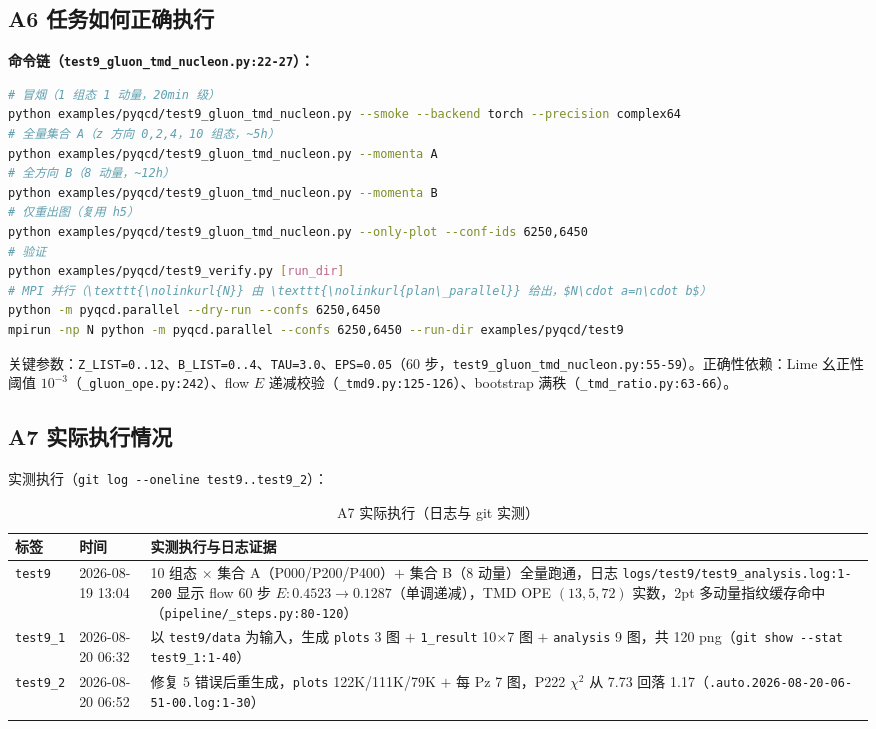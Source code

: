 \documentclass[UTF8]{ctexart}
\begin{document}
\subsection{A6 任务如何正确执行}
\label{sec:a6}
\textbf{命令链（\texttt{\nolinkurl{test9\_gluon\_tmd\_nucleon.py:22-27}}）：}
\begin{lstlisting}[language=bash]
# 冒烟（1 组态 1 动量，20min 级）
python examples/pyqcd/test9_gluon_tmd_nucleon.py --smoke --backend torch --precision complex64
# 全量集合 A（z 方向 0,2,4，10 组态，~5h）
python examples/pyqcd/test9_gluon_tmd_nucleon.py --momenta A
# 全方向 B（8 动量，~12h）
python examples/pyqcd/test9_gluon_tmd_nucleon.py --momenta B
# 仅重出图（复用 h5）
python examples/pyqcd/test9_gluon_tmd_nucleon.py --only-plot --conf-ids 6250,6450
# 验证
python examples/pyqcd/test9_verify.py [run_dir]
# MPI 并行（\texttt{\nolinkurl{N}} 由 \texttt{\nolinkurl{plan\_parallel}} 给出，$N\cdot a=n\cdot b$）
python -m pyqcd.parallel --dry-run --confs 6250,6450
mpirun -np N python -m pyqcd.parallel --confs 6250,6450 --run-dir examples/pyqcd/test9
\end{lstlisting}
关键参数：\texttt{\nolinkurl{Z\_LIST=0..12}}、\texttt{\nolinkurl{B\_LIST=0..4}}、\texttt{\nolinkurl{TAU=3.0}}、\texttt{\nolinkurl{EPS=0.05}}（60 步，\texttt{\nolinkurl{test9\_gluon\_tmd\_nucleon.py:55-59}}）。正确性依赖：Lime 幺正性阈值 $10^{-3}$（\texttt{\nolinkurl{\_gluon\_ope.py:242}}）、flow $E$ 递减校验（\texttt{\nolinkurl{\_tmd9.py:125-126}}）、bootstrap 满秩（\texttt{\nolinkurl{\_tmd\_ratio.py:63-66}}）。

\subsection{A7 实际执行情况}
\label{sec:a7}
实测执行（\texttt{\nolinkurl{git log --oneline test9..test9\_2}}）：
\small
\begin{xltabular}{\textwidth}{llX}
\toprule
标签 & 时间 & 实测执行与日志证据 \\
\midrule
\endhead
\texttt{\nolinkurl{test9}} & 2026-08-19 13:04 & 10 组态 $\times$ 集合 A（P000/P200/P400）$+$ 集合 B（8 动量）全量跑通，日志 \texttt{\nolinkurl{logs/test9/test9\_analysis.log:1-200}} 显示 flow 60 步 $E:0.4523\to0.1287$（单调递减），TMD OPE $(13,5,72)$ 实数，2pt 多动量指纹缓存命中（\texttt{\nolinkurl{pipeline/\_steps.py:80-120}}） \\
\texttt{\nolinkurl{test9\_1}} & 2026-08-20 06:32 & 以 \texttt{\nolinkurl{test9/data}} 为输入，生成 \texttt{\nolinkurl{plots}} 3 图 $+$ \texttt{\nolinkurl{1\_result}} 10$\times$7 图 $+$ \texttt{\nolinkurl{analysis}} 9 图，共 120 png（\texttt{\nolinkurl{git show --stat test9\_1:1-40}}）\\
\texttt{\nolinkurl{test9\_2}} & 2026-08-20 06:52 & 修复 5 错误后重生成，\texttt{\nolinkurl{plots}} 122K/111K/79K $+$ 每 Pz 7 图，P222 $\chi^2$ 从 7.73 回落 1.17（\texttt{\nolinkurl{.auto.2026-08-20-06-51-00.log:1-30}}）\\
\bottomrule
\caption{A7 实际执行（日志与 git 实测）}
\end{xltabular}
\end{document}

